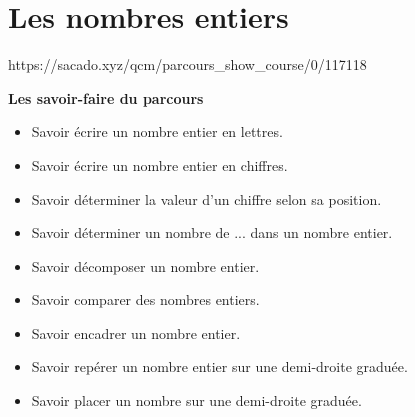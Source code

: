 \chapter{Les nombres entiers}
{https://sacado.xyz/qcm/parcours_show_course/0/117118}
{


 \begin{CpsCol}
\textbf{Les savoir-faire du parcours} 
 \begin{itemize}
 \item Savoir écrire un nombre entier en lettres.
 \item Savoir écrire un nombre entier en chiffres.
 \item Savoir déterminer la valeur d'un chiffre selon sa position.
 \item Savoir déterminer un nombre de ... dans un nombre entier.
 \item Savoir décomposer un nombre entier.
 \item Savoir comparer des nombres entiers.
 \item Savoir encadrer un nombre entier.
 \item Savoir repérer un nombre entier sur une demi-droite graduée.
 \item Savoir placer un nombre sur une demi-droite graduée.
 \end{itemize}
 \end{CpsCol}

}


